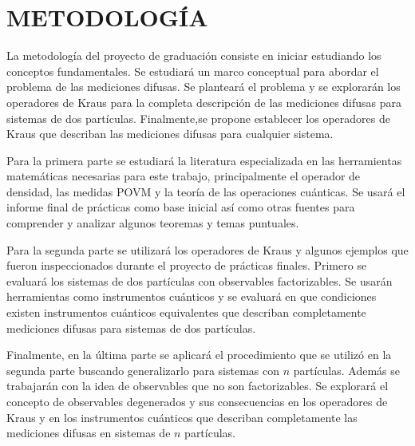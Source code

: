 \chapter{METODOLOGÍA}%


La metodología del proyecto de graduación consiste en iniciar estudiando los conceptos fundamentales. Se estudiará un marco conceptual para abordar el problema de las mediciones difusas. Se planteará el problema y se explorarán los operadores de Kraus para la completa descripción de las mediciones difusas para sistemas de dos partículas. Finalmente,se propone establecer los operadores de Kraus que describan las mediciones difusas para cualquier sistema.



Para la primera parte se estudiará la literatura especializada en las herramientas matemáticas necesarias para este trabajo, principalmente el operador de densidad, las medidas POVM y la teoría de las operaciones cuánticas. Se usará el informe final de prácticas como base inicial así como  otras fuentes para comprender y analizar algunos teoremas y temas puntuales.




Para la segunda parte se utilizará los operadores de Kraus y algunos ejemplos que fueron inspeccionados durante el proyecto de prácticas finales. Primero se evaluará los sistemas de dos partículas con observables factorizables. Se usarán herramientas como instrumentos cuánticos y se evaluará en que condiciones existen instrumentos cuánticos equivalentes que describan completamente mediciones difusas para sistemas de dos partículas.

 Finalmente, en la última parte se aplicará el procedimiento   que se utilizó en la segunda parte buscando generalizarlo para sistemas con $n$ partículas. Además se trabajarán con la idea de observables que no son factorizables. Se explorará el concepto de observables degenerados y sus consecuencias en los operadores de Kraus y en los instrumentos cuánticos que describan completamente las mediciones difusas en sistemas de $n$ partículas.